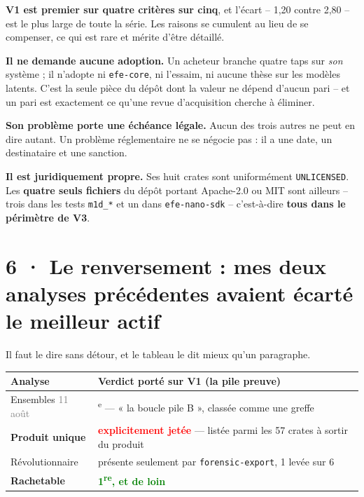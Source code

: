 \documentclass[10pt]{article}
\newcommand{\best}[1]{\textcolor{green}{\textbf{#1}}}
\newcommand{\pire}[1]{\textcolor{red}{\textbf{#1}}}
\newcommand{\sz}[1]{\textcolor{grey}{\small\textsf{#1}}}
\newcommand{\code}[1]{\texttt{\small #1}}
\begin{document}
\textbf{V1 est premier sur quatre critères sur cinq}, et l'écart -- 1,20 contre 2,80 -- est le plus
large de toute la série. Les raisons se cumulent au lieu de se compenser, ce qui est rare et mérite
d'être détaillé.

\textbf{Il ne demande aucune adoption.} Un acheteur branche quatre taps sur \emph{son} système ; il
n'adopte ni \code{efe-core}, ni l'essaim, ni aucune thèse sur les modèles latents. C'est la seule pièce
du dépôt dont la valeur ne dépend d'aucun pari -- et un pari est exactement ce qu'une revue
d'acquisition cherche à éliminer.

\textbf{Son problème porte une échéance légale.} Aucun des trois autres ne peut en dire autant. Un
problème réglementaire ne se négocie pas : il a une date, un destinataire et une sanction.

\textbf{Il est juridiquement propre.} Ses huit crates sont uniformément \code{UNLICENSED}. Les
\textbf{quatre seuls fichiers} du dépôt portant Apache-2.0 ou MIT sont ailleurs -- trois dans les tests
\code{m1d\_*} et un dans \code{efe-nano-sdk} -- c'est-à-dire \textbf{tous dans le périmètre de V3}.

\section{6 · Le renversement : mes deux analyses précédentes avaient écarté le meilleur actif}

Il faut le dire sans détour, et le tableau le dit mieux qu'un paragraphe.

\renewcommand{\arraystretch}{1.18}
\begin{center}\small
\begin{tabular}{@{}>{\raggedright\arraybackslash}p{4.6cm} >{\raggedright\arraybackslash}p{11.2cm}@{}}
\toprule
\textbf{Analyse} & \textbf{Verdict porté sur V1 (la pile preuve)} \\
\midrule
Ensembles \sz{11 août} & 2\textsuperscript{e} --- « la boucle pile B », classée comme une greffe \\
\textbf{Produit unique} & \pire{explicitement jetée} --- listée parmi les 57 crates à sortir du produit \\
Révolutionnaire & présente seulement par \code{forensic-export}, 1 levée sur 6 \\
\textbf{Rachetable} & \best{1\textsuperscript{re}, et de loin} \\
\bottomrule
\end{tabular}
\end{center}
\end{document}
